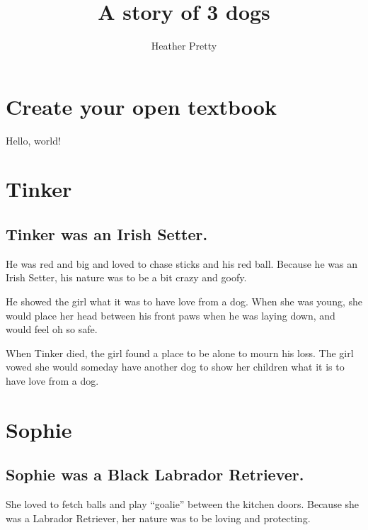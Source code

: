 \documentclass[
  openany]{book}
\title{A story of 3 dogs}
\author{Heather Pretty}
\date{}
\begin{document}
\maketitle

{
\setcounter{tocdepth}{1}
\tableofcontents
}
\hypertarget{create-your-open-textbook}{%
\chapter{Create your open textbook}\label{create-your-open-textbook}}

Hello, world!

\hypertarget{tinker}{%
\chapter{Tinker}\label{tinker}}

\hypertarget{tinker-was-an-irish-setter.}{%
\section{Tinker was an Irish Setter.}\label{tinker-was-an-irish-setter.}}

He was red and big and loved to chase sticks and his red ball.
Because he was an Irish Setter, his nature was to be a bit crazy and goofy.

He showed the girl what it was to have love from a dog.
When she was young, she would place her head between his front paws when he was laying down, and would feel oh so safe.

When Tinker died, the girl found a place to be alone to mourn his loss.
The girl vowed she would someday have another dog to show her children what it is to have love from a dog.

\hypertarget{sophie}{%
\chapter{Sophie}\label{sophie}}

\hypertarget{sophie-was-a-black-labrador-retriever.}{%
\section{Sophie was a Black Labrador Retriever.}\label{sophie-was-a-black-labrador-retriever.}}

She loved to fetch balls and play ``goalie'' between the kitchen doors.
Because she was a Labrador Retriever, her nature was to be loving and protecting.
\end{document}
